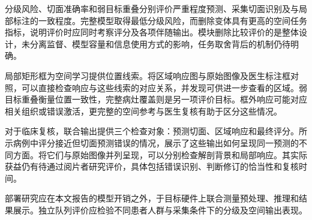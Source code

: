 分级风险、切面准确率和弱目标重叠分别评价严重程度预测、采集切面识别及与局部标注的一致程度。完整模型取得最低分级风险，而删除变体具有更高的空间任务指标，说明评价时应同时考察评分及各项伴随输出。模块删除比较评价的是整体设计，未分离监督、模型容量和信息使用方式的影响，任务取舍背后的机制仍待明确。

局部矩形框为空间学习提供位置线索。将区域响应图与原始图像及医生标注框对照，可以直接检查响应与这些线索的对应关系，并发现可供进一步查看的区域。弱目标重叠衡量位置一致性，完整病灶覆盖则是另一项评价目标。框外响应可能对应相关组织或错误激活，更完整的空间参考与医生复核有助于区分这些情况。

对于临床复核，联合输出提供三个检查对象：预测切面、区域响应和最终评分。所示病例中评分接近但切面预测错误的情况，展示了这些输出如何呈现同一预测的不同方面。将它们与原始图像并列呈现，可以分别检查解剖背景和局部响应。其实际获益仍有待通过阅片者研究评价，具体包括错误识别、判断修订的恰当性和复核时间。

部署研究应在本文报告的模型开销之外，于目标硬件上联合测量预处理、推理和结果展示。独立队列评价应检验不同患者人群与采集条件下的分级及空间输出表现。
